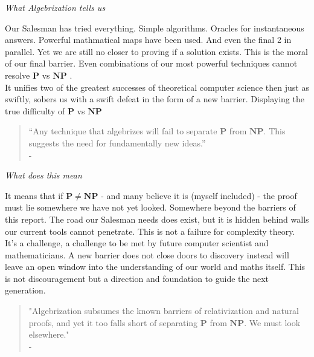 \documentclass[12pt]{report}
\begin{document}
\begin{center}
    {\Large\itshape What Algebrization tells us\par}
\end{center}
Our Salesman has tried everything.
Simple algorithms.
Oracles for instantaneous answers.
Powerful mathmatical maps have been used.
And even the final 2 in parallel.
Yet we are still no closer to proving if a solution exists.
This is the moral of our final barrier.
Even combinations of our most powerful techniques cannot resolve $\mathbf{P}$ vs $\mathbf{NP}$ \citep{arora2008algebrization, arora2009}.\\
\vspace{0.3cm}
It unifies two of the greatest successes of theoretical computer science then just as swiftly, sobers us with a swift defeat in the form of a new barrier.
Displaying the true difficulty of $\mathbf{P}$ vs $\mathbf{NP}$
\begin{quote}
    “Any technique that algebrizes will fail to separate $\mathbf{P}$ from $\mathbf{NP}$. This suggests the need for fundamentally new ideas.”\\
    - \cite[Ch. 20.4]{arora2009}
\end{quote}
\vspace{0.3cm}

\begin{center}
    \vspace{0cm}
    {\Large\itshape What does this mean\par}
\end{center}
It means that if $\mathbf{P \ne NP}$ - and many believe it is (myself included) - the proof must lie somewhere we have not yet looked.
Somewhere beyond the barriers of this report.
The road our Salesman needs does exist, but it is hidden behind walls our current tools cannot penetrate.
This is not a failure for complexity theory.
It's a challenge, a challenge to be met by future computer scientist and mathematicians.
A new barrier does not close doors to discovery instead will leave an open window into the understanding of our world and maths itself.
This is not discouragement but a direction and foundation to guide the next generation.
\begin{quote}
    "Algebrization subsumes the known barriers of relativization and natural proofs, and yet it too falls short of separating $\mathbf{P}$ from $\mathbf{NP}$. We must look elsewhere."\\
    -\cite{arora2008algebrization}
\end{quote}
\end{document}
